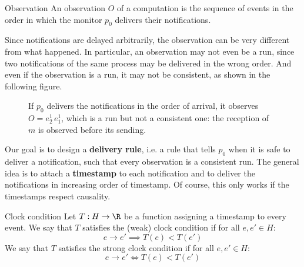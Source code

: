 \begin{frameddefn}{Observation}
  An observation $O$ of a computation is the sequence of events in the order in which the monitor $p_0$ delivers their notifications.
\end{frameddefn}

Since notifications are delayed arbitrarily, the observation can be very different from what happened. In particular, an observation may not even be a run, since two notifications of the same process may be delivered in the wrong order. And even if the observation is a run, it may not be consistent, as shown in the following figure.

\begin{figure}[H]
  \centering
  \caption{If $p_0$ delivers the notifications in the order of arrival, it observes $O = e_2^1\, e_1^1$, which is a run but not a consistent one: the reception of $m$ is observed before its sending.}
  \label{fig:bad-observation}
\end{figure}

Our goal is to design a \textbf{delivery rule}, i.e. a rule that tells $p_0$ when it is safe to deliver a notification, such that every observation is a consistent run. The general idea is to attach a \textbf{timestamp} to each notification and to deliver the notifications in increasing order of timestamp. Of course, this only works if the timestamps respect causality.

\begin{frameddefn}{Clock condition}
  Let $T : H \to \R$ be a function assigning a timestamp to every event. We say that $T$ satisfies the (weak) clock condition if for all $e, e' \in H$:
  \[e \to e' \implies T(e) < T(e')\]
  We say that $T$ satisfies the strong clock condition if for all $e, e' \in H$:
  \[e \to e' \iff T(e) < T(e')\]
\end{frameddefn}

